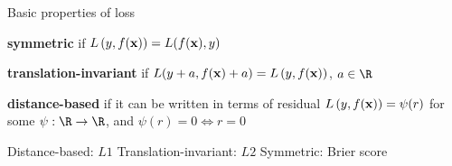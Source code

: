 \documentclass[11pt,compress,t,notes=noshow, xcolor=table]{beamer}
\begin{document}
\begin{framei}{Basic properties of loss}

  \item \textbf{symmetric} if $L\left(y, f(\mathbf{x})\right) = L(f(\mathbf{x}), y)$
  \item \textbf{translation-invariant} if $L(y + a, f(\mathbf{x}) + a) = L\left(y, f(\mathbf{x})\right)$, 
  $a \in \R$
  \item \textbf{distance-based} if it can be written in terms of residual 
    $L\left(y, f(\mathbf{x})\right) = \psi (r)$ for some $\psi: \R \to \R$, and 
    $\psi(r) = 0 \Leftrightarrow r = 0$

\vfill

\splitVThree
{
  \tiny \centering
  Distance-based: $L1$
}%
{
  \tiny \centering
  Translation-invariant: $L2$
}%
{
  \tiny \centering
  Symmetric: Brier score
}

\end{framei}

\end{document}
